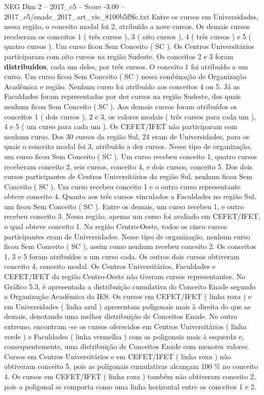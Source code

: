 \begin{textsample}{NEG Dim 2 – 2017\_c5 – Score -3.00 – 2017\_c5/enade\_2017\_art\_vis\_8100b5f9fc.txt}
Entre os cursos em Universidades, nessa região, o conceito modal foi 2, atribuído a nove cursos.
Os demais cursos receberam os conceitos 1 ( três cursos ), 3 ( oito cursos ), 4 ( três cursos ) e 5 ( quatro cursos ).
Um curso ficou Sem Conceito ( SC ).
Os Centros Universitários participaram com oito cursos na região Sudeste.
Os conceitos 2 e 3 foram \textbf{distribuídos}, cada um deles, por três cursos.
O conceito 1 foi atribuído a um curso.
Um curso ficou Sem Conceito ( SC ) nessa combinação de Organização Acadêmica e região.
Nenhum curso foi atribuído aos conceitos 4 ou 5.
Já as Faculdades foram representadas por dez cursos na região Sudeste, dos quais nenhum ficou Sem Conceito ( SC ).
Aos demais cursos foram atribuídos os conceitos 1 ( dois cursos ), 2 e 3, os valores modais ( três cursos para cada um ), 4 e 5 ( um curso para cada um ).
Os CEFET/IFET não participaram com nenhum curso.
Dos 30 cursos da região Sul, 24 eram de Universidades, para os quais o conceito modal foi 3, atribuído a dez cursos.
Nesse tipo de organização, um curso ficou Sem Conceito ( SC ).
Um curso recebeu conceito 1, quatro cursos receberam conceito 2, seis cursos, conceito 4, e dois cursos, conceito 5.
Dos dois cursos participantes de Centros Universitários da região Sul, nenhum ficou Sem Conceito ( SC ).
Um curso recebeu conceito 1 e o outro curso representante obteve conceito 4.
Quanto aos três cursos vinculados a Faculdades na região Sul, um ficou Sem Conceito ( SC ).
Entre os demais, um curso recebeu 1, e outro recebeu conceito 3.
Nessa região, apenas um curso foi avaliado em CEFET/IFET, o qual obteve conceito 1.
Na região Centro-Oeste, todos os cinco cursos participantes eram de Universidades.
Nesse tipo de organização, nenhum curso ficou Sem Conceito ( SC ), assim como nenhum recebeu conceito 2.
Os conceitos 1, 3 e 5 foram atribuídos a um curso cada.
Os outros dois cursos obtiveram conceito 4, conceito modal.
Os Centros Universitários, Faculdades e CEFET/IFET da região Centro-Oeste não tiveram cursos representantes.
No Gráfico 5.3, é apresentada a distribuição cumulativa do Conceito Enade segundo a Organização Acadêmica da IES.
Os cursos em CEFET/IFET ( linha roxa ) e em Universidades ( linha azul ) apresentam poligonais mais à direita do que as demais, denotando uma melhor distribuição de Conceitos Enade.
No outro extremo, encontram -se os cursos oferecidos em Centros Universitários ( linha verde ) e Faculdades ( linha vermelha ) com as poligonais mais à esquerda e, consequentemente, uma distribuição de Conceitos Enade com menores valores.
Cursos em Centros Universitários e em CEFET/IFET ( linha roxa ) não obtiveram conceito 5, pois as poligonais cumulativas alcançam 100 \% no conceito 4.
Os cursos em CEFET/IFET ( linha roxa ) também não obtiveram conceito 2, pois a poligonal se comporta como uma linha horizontal entre os conceitos 1 e 2.

\end{textsample}

